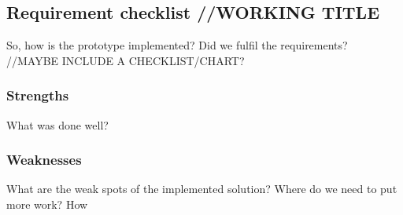 \subsection{Requirement checklist //WORKING TITLE}

So, how is the prototype implemented? Did we fulfil the requirements? //MAYBE INCLUDE A CHECKLIST/CHART?

\subsubsection{Strengths}
What was done well?

\subsubsection{Weaknesses}
What are the weak spots of the implemented solution? Where do we need to put more work? How